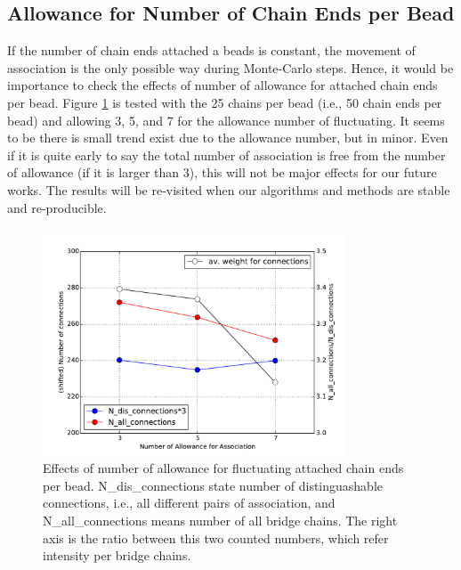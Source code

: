 \message{ !name(brief_Brownian_dynamics.tex)}\documentclass[10pt, a4paper]{report}
\begin{document}

\subsection{Allowance for Number of Chain Ends per Bead}
If the number of chain ends attached a beads is constant, the movement of association is the only possible way during Monte-Carlo steps. Hence, it would be importance to check the effects of number of allowance for attached chain ends per bead. Figure \ref{fig:TN_effect} is tested with the 25 chains per bead (i.e., 50 chain ends per bead) and allowing 3, 5, and 7 for the allowance number of fluctuating. It seems to be there is small trend exist due to the allowance number, but in minor. Even if it is quite early to say the total number of association is free from the number of allowance (if it is larger than 3), this will not be major effects for our future works. The results will be re-visited when our algorithms and methods are stable and re-producible.

\begin{figure}
  \centering
  \includegraphics[width=0.8\textwidth]{figures/TN_effect.pdf}
  \caption{Effects of number of allowance for fluctuating attached chain ends per bead. N{\_}dis{\_}connections state number of distinguashable connections, i.e., all different pairs of association, and N{\_}all{\_}connections means number of all bridge chains. The right axis is the ratio between this two counted numbers, which refer intensity per bridge chains.}
  \label{fig:TN_effect}
\end{figure}
\end{document}
